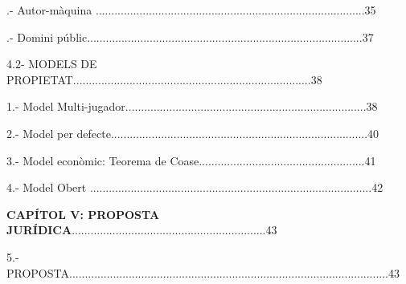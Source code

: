 \documentclass[12pt]{article}
\begin{document}
\vspace{\baselineskip}
\begin{justify}
.- Autor-màquina ......................................................................................35
\end{justify}\par


\vspace{\baselineskip}
\begin{justify}
.- Domini públic........................................................................................37
\end{justify}\par


\vspace{\baselineskip}
\begin{justify}
4.2- MODELS DE PROPIETAT............................................................................38
\end{justify}\par


\vspace{\baselineskip}
1.- Model Multi-jugador.............................................................................38\par


\vspace{\baselineskip}
2.- Model per defecte..................................................................................40\par


\vspace{\baselineskip}
3.- Model econòmic: Teorema de Coase.....................................................41\par


\vspace{\baselineskip}
4.- Model Obert ..........................................................................................42\par


\vspace{\baselineskip}
\begin{justify}
\textbf{CAPÍTOL V: PROPOSTA JURÍDICA}..............................................................43
\end{justify}\par


\vspace{\baselineskip}
\begin{justify}
5.- PROPOSTA......................................................................................................43
\end{justify}\par
\end{document}
